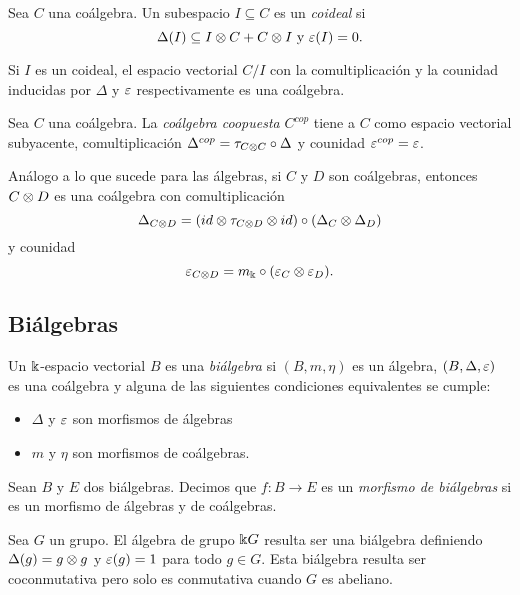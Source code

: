 \documentclass[a4paper,oneside,fleqn,11pt,../tesis.tex]{subfiles}
\begin{document}
\begin{definition}
	Sea $C$ una coálgebra. Un subespacio $I \subseteq C$ es un \emph{coideal} si 
	\[
		\Delta(I) \subseteq I \otimes C + C \otimes I \text{ y } \varepsilon(I) = 0.
	\]
\end{definition}

Si $I$ es un coideal, el espacio vectorial $C/I$ con la comultiplicación y la counidad
inducidas por $\Delta$ y $\varepsilon$ respectivamente es una coálgebra.

\begin{definition}
	Sea $C$ una coálgebra. La \emph{coálgebra coopuesta} $C^{cop}$ tiene a $C$ como espacio vectorial subyacente, 
	comultiplicación $\Delta^{cop} = \tau_{C \otimes C} \circ \Delta$ y counidad $\varepsilon^{cop} = \varepsilon$.
\end{definition}

\begin{obs}
	Análogo a lo que sucede para las álgebras, si $C$ y $D$ son coálgebras, entonces $C \otimes D$ es una coálgebra
	con comultiplicación
	\[
		\Delta_{C \otimes D} = (id \otimes \tau_{C \otimes D} \otimes id) \circ (\Delta_C \otimes \Delta_D)
	\] y counidad \[
		\varepsilon_{C \otimes D} = m_{\Bbbk} \circ (\varepsilon_C \otimes \varepsilon_D).
	\]
\end{obs}
\subsection{Biálgebras}

\begin{definition}
	Un $\Bbbk$-espacio vectorial $B$ es una \emph{biálgebra} si $\left(B, m, \eta\right)$ es un álgebra,
	$\left(B, \Delta, \varepsilon \right)$ es una coálgebra y alguna de las siguientes condiciones equivalentes
	se cumple:
	\begin{itemize}
		\item $\Delta$ y $\varepsilon$ son morfismos de álgebras
		\item $m$ y $\eta$ son morfismos de coálgebras.
	\end{itemize}
\end{definition}

\begin{definition}
	Sean $B$ y $E$ dos biálgebras. Decimos que $f: B \to E$ es un \emph{morfismo de biálgebras} si
	es un morfismo de álgebras y de coálgebras.
\end{definition}

\begin{example}
	Sea $G$ un grupo. El álgebra de grupo $\Bbbk G$ resulta ser una biálgebra definiendo $\Delta(g) = g \otimes g$
	y $\varepsilon(g) = 1$ para todo $g \in G$. Esta biálgebra resulta ser coconmutativa pero solo es conmutativa
	cuando $G$ es abeliano. 
\end{example}
\end{document}
